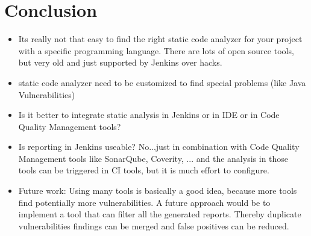 \documentclass[conference]{IEEEtran}
\begin{document}

\section{Conclusion}
\label{sec:conclusion}
\begin{itemize}
	\item Its really not that easy to find the right static code analyzer for your project with a specific programming language. There are lots of open source tools, but very old and just supported by Jenkins over hacks.
	\item static code analyzer need to be customized to find special problems (like Java Vulnerabilities)
	\item Is it better to integrate static analysis in Jenkins or in IDE or in Code Quality Management tools?
	\item Is reporting in Jenkins useable? No...just in combination with Code Quality Management tools like SonarQube, Coverity, ... and the analysis in those tools can be triggered in CI tools, but it is much effort to configure.
	\item Future work: Using many tools is basically a good idea, because more tools find potentially more vulnerabilities. A future approach would be to implement a tool that can filter all the generated reports. Thereby duplicate vulnerabilities findings can be merged and false positives can be reduced.
\end{itemize}





\end{document}
